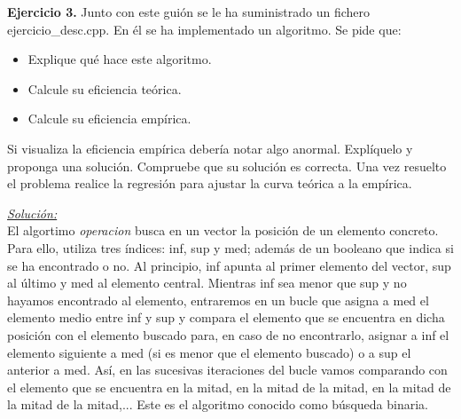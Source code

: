 \documentclass[titlepage, 12pt,a4paper]{article}
\begin{document}
\textbf{\large Ejercicio 3.} Junto con este guión se le ha suministrado un fichero ejercicio\_desc.cpp. En él se ha implementado un algoritmo. Se pide que:\\ 
	\begin{itemize}  
	\item  Explique qué hace este algoritmo.
	\item  Calcule su eficiencia teórica. 
	\item Calcule su eficiencia empírica.
	\end{itemize}
Si visualiza la eficiencia empírica debería notar algo anormal. Explíquelo y proponga una solución. Compruebe que su solución es correcta. Una vez resuelto el problema realice la regresión para ajustar la curva teórica a la empírica.
\vspace {1em}	

\underline{\emph{Solución:}}\\
El algortimo \textit{operacion} busca en un vector la posición de un elemento concreto. Para ello, utiliza tres índices: inf, sup y med; además de un booleano que indica si se ha encontrado o no. Al principio, inf apunta al primer elemento del vector, sup al último y med al elemento central. Mientras inf sea menor que sup y no hayamos encontrado al elemento, entraremos en un bucle que asigna a med el elemento medio entre inf y sup y compara el elemento que se encuentra en dicha posición con el elemento buscado para, en caso de no encontrarlo, asignar a inf el elemento siguiente a med (si es menor que el elemento buscado) o a sup el anterior a med. Así, en las sucesivas iteraciones del bucle vamos comparando con el elemento que se encuentra en la mitad, en la mitad de la mitad, en la mitad de la mitad de la mitad,... Este es el algoritmo conocido como búsqueda binaria.\vspace{1em}
\end{document}
